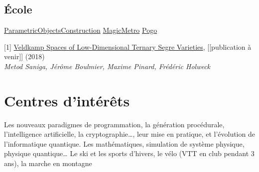 \documentclass[10pt,sans]{moderncv}
\begin{document}
		\subsection{École}
				{\href{https://github.com/pinam45/UTBM\_IN55\_ParametricObjectsConstruction}{ParametricObjectsConstruction}}
				{\href{https://github.com/TiWinDeTea/MagicMetro}{MagicMetro}}
				{\href{https://github.com/pinam45/UTBM_IA41_Pogo}{Pogo}}


	\vspace*{\deletedSpace}
	\begin{thebibliography}{}
		[1] \href{https://arxiv.org/abs/1806.08965}{Veldkamp Spaces of Low-Dimensional Ternary Segre Varieties}, [[publication à venir]] (2018)\\
		\textit{Metod Saniga, Jérôme Boulmier, Maxime Pinard, Frédéric Holweck}
	\end{thebibliography}


	\vspace*{\deletedSpace}
	\section{Centres d'intérêts}
			{Les nouveaux paradigmes de programmation, la génération procédurale, l'intelligence artificielle, la cryptographie\ldots{}, leur mise en pratique, et l'évolution de l'informatique quantique.}
			{Les mathématiques, simulation de système physique, physique quantique\ldots}
			{Le ski et les sports d'hivers, le vélo (VTT en club pendant 3 ans), la marche en montagne}
\end{document}

